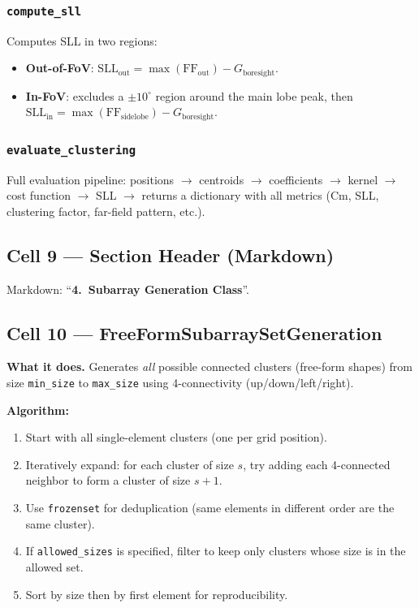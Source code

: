 \documentclass[11pt,a4paper]{article}
\begin{document}
\subsubsection{\texttt{compute\_sll}}
Computes SLL in two regions:
\begin{itemize}
    \item \textbf{Out-of-FoV}: $\text{SLL}_{\text{out}} = \max(\text{FF}_{\text{out}}) - G_{\text{boresight}}$.
    \item \textbf{In-FoV}: excludes a $\pm 10^\circ$ region around the main lobe peak,
          then $\text{SLL}_{\text{in}} = \max(\text{FF}_{\text{sidelobe}}) - G_{\text{boresight}}$.
\end{itemize}

\subsubsection{\texttt{evaluate\_clustering}}
Full evaluation pipeline: positions $\to$ centroids $\to$ coefficients $\to$
kernel $\to$ cost function $\to$ SLL $\to$ returns a dictionary with all metrics
(Cm, SLL, clustering factor, far-field pattern, etc.).

\subsection{Cell 9 --- Section Header (Markdown)}
Markdown: ``\textbf{4.\ Subarray Generation Class}''.

\subsection{Cell 10 --- FreeFormSubarraySetGeneration}
\label{sec:cell10}

\textbf{What it does.}
Generates \emph{all} possible connected clusters (free-form shapes) from size
\texttt{min\_size} to \texttt{max\_size} using 4-connectivity (up/down/left/right).

\textbf{Algorithm:}
\begin{enumerate}
    \item Start with all single-element clusters (one per grid position).
    \item Iteratively expand: for each cluster of size $s$, try adding each
          4-connected neighbor to form a cluster of size $s+1$.
    \item Use \texttt{frozenset} for deduplication (same elements in different order
          are the same cluster).
    \item If \texttt{allowed\_sizes} is specified, filter to keep only clusters whose
          size is in the allowed set.
    \item Sort by size then by first element for reproducibility.
\end{enumerate}
\end{document}
